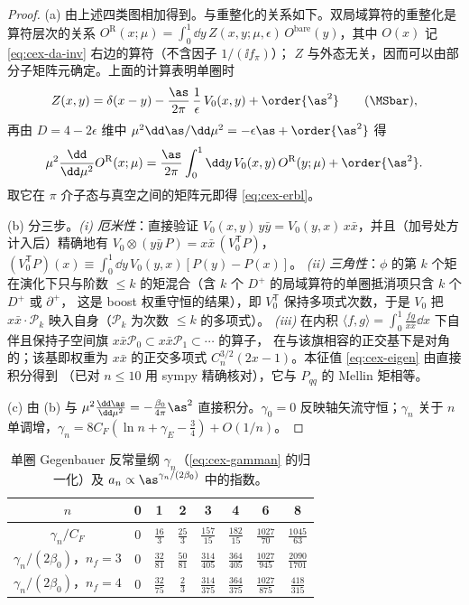 \begin{proof}
(a) 由上述四类图相加得到。与重整化的关系如下。双局域算符的重整化是算符层次的关系
$O^{\mathrm R}(x;\mu)=\int_0^1\dd y\,Z(x,y;\mu,\epsilon)\,O^{\mathrm{bare}}(y)$，其中 $O(x)$ 记 \cref{eq:cex-da-inv} 右边的算符（不含因子 $1/(\ii f_\pi)$）；
$Z$ 与外态无关，因而可以由部分子矩阵元确定。上面的计算表明单圈时
\begin{equation*}
Z(x,y)=\delta(x-y)-\frac{\as}{2\pi}\,\frac{1}{\epsilon}\,V_0(x,y)+\order{\as^2}\qquad(\MSbar),
\end{equation*}
再由 $D=4-2\epsilon$ 维中 $\mu^2\dd\as/\dd\mu^2=-\epsilon\as+\order{\as^2}$ 得
\begin{equation*}
\mu^2\frac{\dd}{\dd\mu^2}O^{\mathrm R}(x;\mu)=\frac{\as}{2\pi}\int_0^1\dd y\,V_0(x,y)\,O^{\mathrm R}(y;\mu)+\order{\as^2}.
\end{equation*}
取它在 $\pi$ 介子态与真空之间的矩阵元即得 \cref{eq:cex-erbl}。

(b) 分三步。\emph{(i) 厄米性}：直接验证 $V_0(x,y)\,y\bar y=V_0(y,x)\,x\bar x$，并且（加号处方计入后）精确地有
$V_0\otimes(y\bar y\,P)=x\bar x\,(V_0^{\mathsf T}P)$，$(V_0^{\mathsf T}P)(x)\equiv\int_0^1\dd y\,V_0(y,x)[P(y)-P(x)]$。
\emph{(ii) 三角性}：$\phi$ 的第 $k$ 个矩在演化下只与阶数 $\le k$ 的矩混合（含 $k$ 个 $D^+$ 的局域算符的单圈抵消项只含 $k$ 个 $D^+$ 或 $\partial^+$，
这是 boost 权重守恒的结果），即 $V_0^{\mathsf T}$ 保持多项式次数，于是 $V_0$ 把 $x\bar x\cdot\mathcal P_k$ 映入自身（$\mathcal P_k$ 为次数 $\le k$ 的多项式）。
\emph{(iii)} 在内积 $\langle f,g\rangle=\int_0^1\frac{fg}{x\bar x}\dd x$ 下自伴且保持子空间旗 $x\bar x\mathcal P_0\subset x\bar x\mathcal P_1\subset\cdots$ 的算子，
在与该旗相容的正交基下是对角的；该基即权重为 $x\bar x$ 的正交多项式 $C^{3/2}_n(2x-1)$。本征值 \cref{eq:cex-eigen} 由直接积分得到
（已对 $n\le10$ 用 sympy 精确核对），它与 $P_{qq}$ 的 Mellin 矩相等。

(c) 由 (b) 与 $\mu^2\frac{\dd\as}{\dd\mu^2}=-\frac{\beta_0}{4\pi}\as^2$ 直接积分。$\gamma_0=0$ 反映轴矢流守恒；$\gamma_n$ 关于 $n$ 单调增，$\gamma_n=8C_F(\ln n+\gamma_E-\frac34)+O(1/n)$。
\end{proof}

\begin{table}[htbp]
\centering
\caption{单圈 Gegenbauer 反常量纲 $\gamma_n$（\cref{eq:cex-gamman} 的归一化）及 $a_n\propto\as^{\gamma_n/(2\beta_0)}$ 中的指数。}
\label{tab:cex-gamman}
\begin{tabular}{@{}cccccccc@{}}
\toprule
$n$ & 0 & 1 & 2 & 3 & 4 & 6 & 8\\
\midrule
$\gamma_n/C_F$ & 0 & $\frac{16}{3}$ & $\frac{25}{3}$ & $\frac{157}{15}$ & $\frac{182}{15}$ & $\frac{1027}{70}$ & $\frac{1045}{63}$\\[2pt]
$\gamma_n/(2\beta_0)$，$n_f=3$ & 0 & $\frac{32}{81}$ & $\frac{50}{81}$ & $\frac{314}{405}$ & $\frac{364}{405}$ & $\frac{1027}{945}$ & $\frac{2090}{1701}$\\[2pt]
$\gamma_n/(2\beta_0)$，$n_f=4$ & 0 & $\frac{32}{75}$ & $\frac{2}{3}$ & $\frac{314}{375}$ & $\frac{364}{375}$ & $\frac{1027}{875}$ & $\frac{418}{315}$\\
\bottomrule
\end{tabular}
\end{table}

